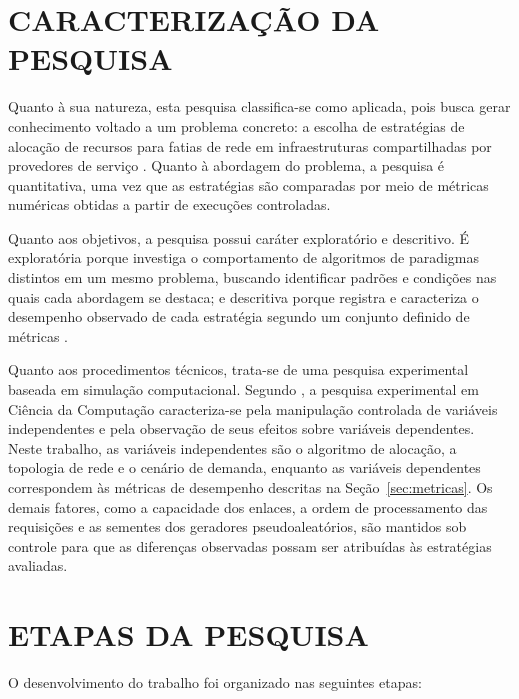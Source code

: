 \section{CARACTERIZAÇÃO DA PESQUISA}
\label{sec:caracterizacao}

Quanto à sua natureza, esta pesquisa classifica-se como aplicada, pois busca gerar conhecimento voltado a um problema concreto: a escolha de estratégias de alocação de recursos para fatias de rede em infraestruturas compartilhadas por provedores de serviço \cite{gil2008}. Quanto à abordagem do problema, a pesquisa é quantitativa, uma vez que as estratégias são comparadas por meio de métricas numéricas obtidas a partir de execuções controladas.

Quanto aos objetivos, a pesquisa possui caráter exploratório e descritivo. É exploratória porque investiga o comportamento de algoritmos de paradigmas distintos em um mesmo problema, buscando identificar padrões e condições nas quais cada abordagem se destaca; e descritiva porque registra e caracteriza o desempenho observado de cada estratégia segundo um conjunto definido de métricas \cite{gil2008}.

Quanto aos procedimentos técnicos, trata-se de uma pesquisa experimental baseada em simulação computacional. Segundo , a pesquisa experimental em Ciência da Computação caracteriza-se pela manipulação controlada de variáveis independentes e pela observação de seus efeitos sobre variáveis dependentes. Neste trabalho, as variáveis independentes são o algoritmo de alocação, a topologia de rede e o cenário de demanda, enquanto as variáveis dependentes correspondem às métricas de desempenho descritas na Seção~\ref{sec:metricas}. Os demais fatores, como a capacidade dos enlaces, a ordem de processamento das requisições e as sementes dos geradores pseudoaleatórios, são mantidos sob controle para que as diferenças observadas possam ser atribuídas às estratégias avaliadas.

\section{ETAPAS DA PESQUISA}
\label{sec:etapas}

O desenvolvimento do trabalho foi organizado nas seguintes etapas:

